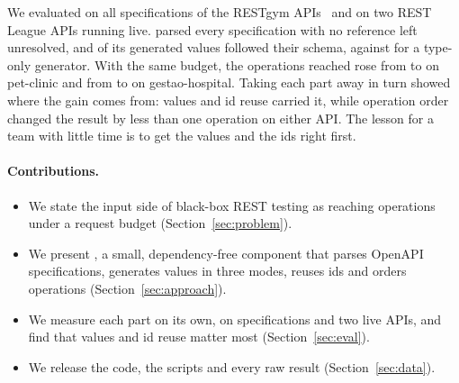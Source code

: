 We evaluated \tool on all \NSpecs specifications of the RESTgym
APIs~\cite{restgym} and on two REST League APIs running live. \tool parsed
every specification with no reference left unresolved, and \NConfTool of its
generated values followed their schema, against \NConfBaseline for a
type-only generator. With the same budget, the operations reached rose from
\NPetclinicBaselineCov to \NPetclinicFullCov on pet-clinic and from
\NGestaohospitalBaselineCov to \NGestaohospitalFullCov on gestao-hospital.
Taking each part away in turn showed where the gain comes from: values and
id reuse carried it, while operation order changed the result by less than
one operation on either API. The lesson for a team with little time is to get the values and
the ids right first.

\paragraph{Contributions.}
\begin{itemize}
  \item We state the input side of black-box REST testing as reaching
    operations under a request budget (Section~\ref{sec:problem}).
  \item We present \tool, a small, dependency-free component that parses
    OpenAPI specifications, generates values in three modes, reuses ids and
    orders operations (Section~\ref{sec:approach}).
  \item We measure each part on its own, on \NSpecs specifications and two
    live APIs, and find that values and id reuse matter most
    (Section~\ref{sec:eval}).
  \item We release the code, the scripts and every raw result
    (Section~\ref{sec:data}).
\end{itemize}
